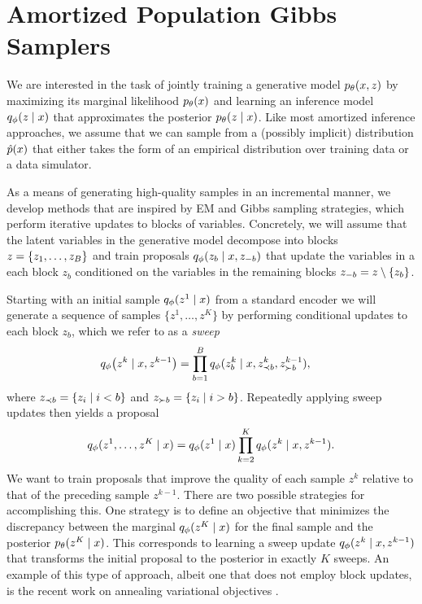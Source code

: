 \documentclass{article}
\theoremstyle{definition}
\begin{document}
\iffalse
\section{Amortized Population Gibbs Samplers}
\label{sec:amortized-gibbs}
We are interested in the task of jointly training a generative model $p_\theta(x, z)$ by maximizing its marginal likelihood $p_\theta(x)$ and learning an inference model $q_\phi(z \mid x)$ that approximates the posterior $p_\theta(z \mid x)$. Like most amortized inference approaches, we assume that we can sample from a (possibly implicit) distribution $\hat{p}(x)$ that either takes the form of an empirical distribution over training data or a data simulator.

As a means of generating high-quality samples in an incremental manner, we develop methods that are inspired by EM and Gibbs sampling strategies, which perform iterative updates to blocks of variables. Concretely, we will assume that the latent variables in the generative model decompose into blocks $z = \{z_1, \ldots, z_B\}$ and train proposals $q_\phi(z_b \mid x, z_{-b})$ that update the variables in a each block $z_{b}$ conditioned on the variables in the remaining blocks $z_{-b} = z \setminus \{z_b\}$.

Starting with an initial sample $q_\phi(z^{1} \mid x)$ from a standard encoder we will generate a sequence of samples $\{z^1, \ldots, z^K\}$ by performing conditional updates to each block $z_b$, which we refer to as a \emph{sweep}
\begin{align}
    \label{eq:approx-gibbs-kernel}
    q_\phi \big( z^k \mid x, z^{k-1} \big)
    &=
    \prod_{b=1}^B
    q_\phi(z^k_b \mid x, z^{k}_{\prec b}, z^{k-1}_{\succ b})
    ,
\end{align}
where $z_{\prec b} = \{z_i \mid i < b\}$ and $z_{\succ b} = \{z_i \mid i > b\}$. Repeatedly applying sweep updates then yields a proposal
\begin{equation*}
    q_\phi(z^1, \ldots, z^K \mid x) 
    =
    q_\phi(z^1 \mid x)
    \prod_{k=2}^K
    q_\phi(z^k \mid x, z^{k-1}).
\end{equation*}
We want to train proposals that improve the quality of each sample $z^k$ relative to that of the preceding sample $z^{k-1}$. There are two possible strategies for accomplishing this. One strategy is to define an objective that minimizes the discrepancy between the marginal $q_\phi(z^K \mid x)$ for the final sample and the posterior $p_\theta(z^K \mid x)$. This corresponds to learning a sweep update $q_\phi(z^k \mid x, z^{k-1})$ that transforms the initial proposal to the posterior in exactly $K$ sweeps. An example of this type of approach, albeit one that does not employ block updates, is the recent work on annealing variational objectives \cite{huang2018improving}.
\end{document}
